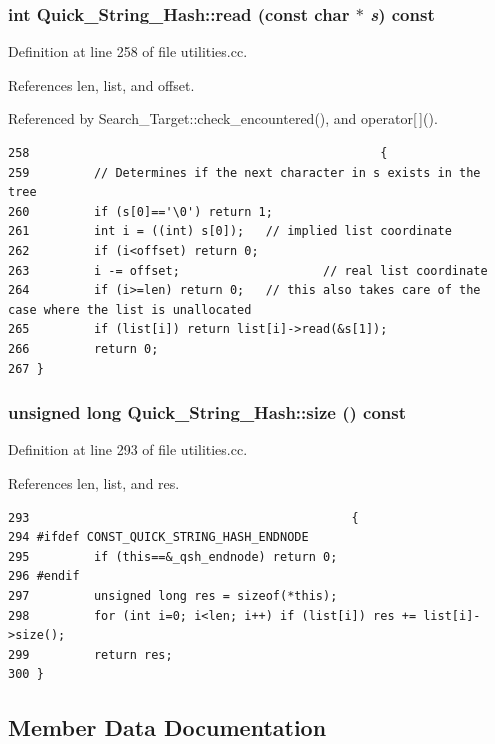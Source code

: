 \subsubsection{\setlength{\rightskip}{0pt plus 5cm}int Quick\_\-String\_\-Hash::read (const char $\ast$ {\em s}) const}\label{classQuick__String__Hash_a4}




Definition at line 258 of file utilities.cc.

References len, list, and offset.

Referenced by Search\_\-Target::check\_\-encountered(), and operator[$\,$]().



\footnotesize\begin{verbatim}258                                                 {
259         // Determines if the next character in s exists in the tree
260         if (s[0]=='\0') return 1;
261         int i = ((int) s[0]);   // implied list coordinate
262         if (i<offset) return 0;
263         i -= offset;                    // real list coordinate
264         if (i>=len) return 0;   // this also takes care of the case where the list is unallocated
265         if (list[i]) return list[i]->read(&s[1]);
266         return 0;
267 }
\end{verbatim}\normalsize 
{}
\subsubsection{\setlength{\rightskip}{0pt plus 5cm}unsigned long Quick\_\-String\_\-Hash::size () const}\label{classQuick__String__Hash_a7}




Definition at line 293 of file utilities.cc.

References len, list, and res.



\footnotesize\begin{verbatim}293                                             {
294 #ifdef CONST_QUICK_STRING_HASH_ENDNODE
295         if (this==&_qsh_endnode) return 0;
296 #endif
297         unsigned long res = sizeof(*this);
298         for (int i=0; i<len; i++) if (list[i]) res += list[i]->size();
299         return res;
300 }
\end{verbatim}\normalsize 


\subsection{Member Data Documentation}
